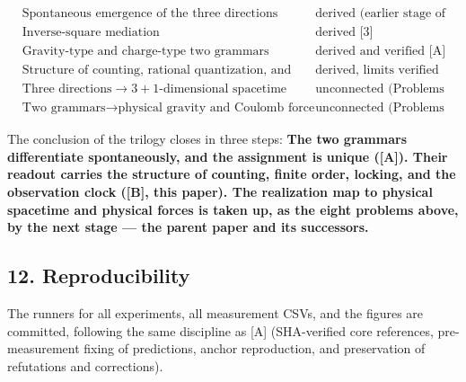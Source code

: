 \documentclass[
  a4paper,
]{article}
\begin{document}
\[
\boxed{
\begin{aligned}
&\text{Spontaneous emergence of the three directions} && \text{derived (earlier stage of this series)}\\
&\text{Inverse-square mediation} && \text{derived [3]}\\
&\text{Gravity-type and charge-type two grammars (unique assignment)} && \text{derived and verified [A]}\\
&\text{Structure of counting, rational quantization, and the observation clock} && \text{derived, limits verified ([B], this paper)}\\
&\text{Three directions}\to 3+1\text{-dimensional spacetime} && \text{unconnected (Problems 1–4)}\\
&\text{Two grammars}\to\text{physical gravity and Coulomb force} && \text{unconnected (Problems 4–7)}
\end{aligned}
}
\]

The conclusion of the trilogy closes in three steps: \textbf{The two
grammars differentiate spontaneously, and the assignment is unique
({[}A{]}). Their readout carries the structure of counting, finite
order, locking, and the observation clock ({[}B{]}, this paper). The
realization map to physical spacetime and physical forces is taken up,
as the eight problems above, by the next stage --- the parent paper and
its successors.}

\subsection{12. Reproducibility}\label{reproducibility}

The runners for all experiments, all measurement CSVs, and the figures
are committed, following the same discipline as {[}A{]} (SHA-verified
core references, pre-measurement fixing of predictions, anchor
reproduction, and preservation of refutations and corrections).
\end{document}
